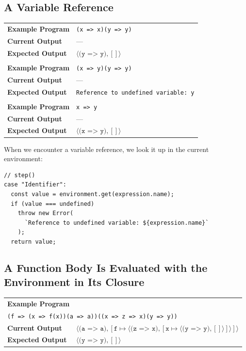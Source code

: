 \documentclass[12pt, oneside]{book}
\begin{document}
\subsection{A Variable Reference}
\label{A Variable Reference}

\begin{center}
\begin{tabular}{ll}
\textbf{Example Program} & \texttt{(x => x)(y => y)} \\
\textbf{Current Output} & — \\
\textbf{Expected Output} & $\langle \texttt{(y => y)}, [] \rangle$ \\
\\
\textbf{Example Program} & \texttt{(x => y)(y => y)} \\
\textbf{Current Output} & — \\
\textbf{Expected Output} & \texttt{Reference to undefined variable: y} \\
\\
\textbf{Example Program} & \texttt{x => y} \\
\textbf{Current Output} & — \\
\textbf{Expected Output} & $\langle \texttt{(x => y)}, [] \rangle$ \\
\end{tabular}
\end{center}

When we encounter a variable reference, we look it up in the current environment:

\begin{verbatim}
// step()
case "Identifier":
  const value = environment.get(expression.name);
  if (value === undefined)
    throw new Error(
      `Reference to undefined variable: ${expression.name}`
    );
  return value;
\end{verbatim}

\subsection{A Function Body Is Evaluated with the Environment in Its Closure}
\label{A Function Body Is Evaluated with the Environment in Its Closure}

\begin{center}
\begin{tabular}{ll}
\textbf{Example Program} & \\
\multicolumn{2}{l}{\texttt{(f => (x => f(x))(a => a))((x => z => x)(y => y))}} \\
\textbf{Current Output} & $\langle \texttt{(a => a)}, [\texttt{f} \mapsto \langle \texttt{(z => x)}, [\texttt{x} \mapsto \langle \texttt{(y => y)}, [] \rangle ] \rangle] \rangle$ \\
\textbf{Expected Output} & $\langle \texttt{(y => y)}, [] \rangle$ \\
\end{tabular}
\end{center}
\end{document}
